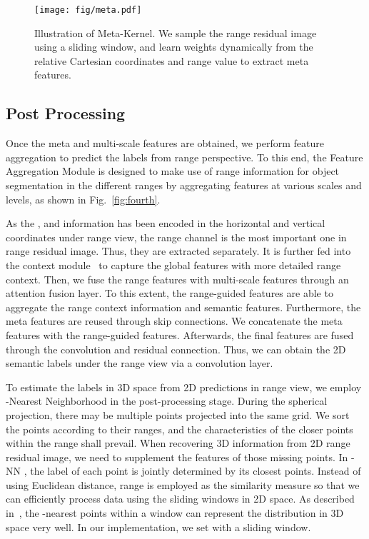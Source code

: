 \documentclass[letterpaper, 10 pt, journal, twoside]{ieeetran}
\begin{document}
\begin{figure}
 \centering
 \setlength{\abovecaptionskip}{-0.2cm}
\texttt{[image: fig/meta.pdf]}
    \caption{Illustration of Meta-Kernel. We sample the range residual image using a  sliding window, and learn weights dynamically from the relative Cartesian coordinates and range value to extract meta features.  }
    \label{fig:third}
    \vspace{-6mm}
\end{figure}

\subsection{Post Processing}
Once the meta and multi-scale features are obtained, we perform feature aggregation to predict the labels from range perspective. To this end, the Feature Aggregation Module is designed to make use of range information for object segmentation in the different ranges by aggregating features at various scales and levels, as shown in Fig.~\ref{fig:fourth}.

As the ,  and  information has been encoded in the horizontal and vertical coordinates under range view, the range channel is the most important one in range residual image. Thus, they are extracted separately.
It is further fed into the context module~\cite{cortinhal2020salsanext} to capture the global features with more detailed range context. Then, we fuse the range features with multi-scale features through an attention fusion layer. To this extent, the range-guided features are able to aggregate the range context information and semantic features. Furthermore, the meta features are reused through skip connections. We concatenate the meta features with the range-guided features. Afterwards, the final features are fused through the convolution and residual connection. Thus, we can obtain the 2D semantic labels under the range view via a  convolution layer.


To estimate the labels in 3D space from 2D predictions in range view, we employ -Nearest Neighborhood in the post-processing stage. During the spherical projection, there may be multiple points projected into the same grid. We sort the points according to their ranges, and the characteristics of the closer points within the range shall prevail. When recovering 3D information from 2D range residual image, we need to supplement the features of those missing points. In -NN , the label of each point is jointly determined by its  closest points. Instead of using Euclidean distance, range is employed as the similarity measure so that we can efficiently process data using the sliding windows in 2D space. As described in~\cite{milioto2019rangenet++}, the -nearest points within a window can represent the distribution in 3D space very well. In our implementation, we set  with a  sliding window.
\end{document}
